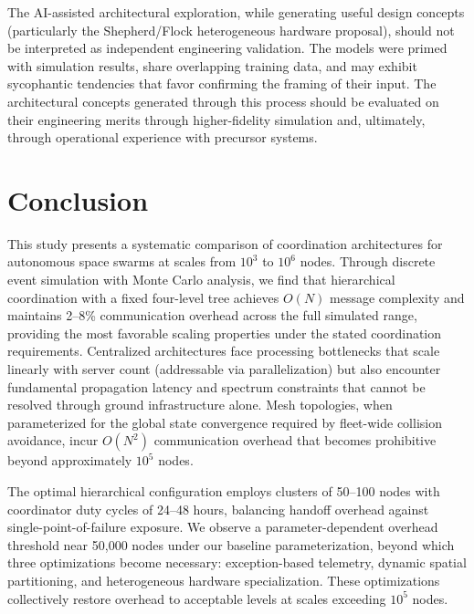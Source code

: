 \documentclass[journal]{IEEEtran}
\begin{document}
The AI-assisted architectural exploration, while generating useful design concepts (particularly the Shepherd/Flock heterogeneous hardware proposal), should not be interpreted as independent engineering validation. The models were primed with simulation results, share overlapping training data, and may exhibit sycophantic tendencies that favor confirming the framing of their input. The architectural concepts generated through this process should be evaluated on their engineering merits through higher-fidelity simulation and, ultimately, through operational experience with precursor systems.


\section{Conclusion}

This study presents a systematic comparison of coordination architectures for autonomous space swarms at scales from $10^3$ to $10^6$ nodes. Through discrete event simulation with Monte Carlo analysis, we find that hierarchical coordination with a fixed four-level tree achieves $O(N)$ message complexity and maintains 2--8\% communication overhead across the full simulated range, providing the most favorable scaling properties under the stated coordination requirements. Centralized architectures face processing bottlenecks that scale linearly with server count (addressable via parallelization) but also encounter fundamental propagation latency and spectrum constraints that cannot be resolved through ground infrastructure alone. Mesh topologies, when parameterized for the global state convergence required by fleet-wide collision avoidance, incur $O(N^2)$ communication overhead that becomes prohibitive beyond approximately $10^5$ nodes.

The optimal hierarchical configuration employs clusters of 50--100 nodes with coordinator duty cycles of 24--48 hours, balancing handoff overhead against single-point-of-failure exposure. We observe a parameter-dependent overhead threshold near 50{,}000 nodes under our baseline parameterization, beyond which three optimizations become necessary: exception-based telemetry, dynamic spatial partitioning, and heterogeneous hardware specialization. These optimizations collectively restore overhead to acceptable levels at scales exceeding $10^5$ nodes.
\end{document}
